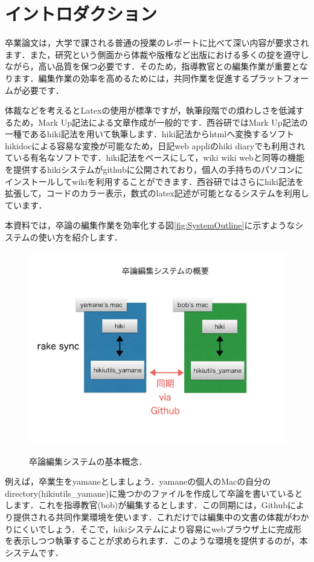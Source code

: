 
\section{イントロダクション}
卒業論文は，大学で課される普通の授業のレポートに比べて深い内容が要求されます．また，研究という側面から体裁や版権など出版における多くの掟を遵守しながら，高い品質を保つ必要です．そのため，指導教官との編集作業が重要となります．編集作業の効率を高めるためには，共同作業を促進するプラットフォームが必要です．

体裁などを考えるとLatexの使用が標準ですが，執筆段階での煩わしさを低減するため，Mark Up記法による文章作成が一般的です\cite{DocGuide}．西谷研ではMark Up記法の一種であるhiki記法を用いて執筆します．hiki記法からhtmlへ変換するソフトhikidocによる容易な変換が可能なため，日記web appliのhiki diaryでも利用されている有名なソフトです．hiki記法をベースにして，wiki wiki webと同等の機能を提供するhikiシステムがgithubに公開されており，個人の手持ちのパソコンにインストールしてwikiを利用することができます．西谷研ではさらにhiki記法を拡張して，コードのカラー表示，数式のlatex記述が可能となるシステムを利用しています．

本資料では，卒論の編集作業を効率化する図\ref{fig:SystemOutline}に示すようなシステムの使い方を紹介します．

\begin{figure}[htbp]\begin{center}
\includegraphics[width=12cm,bb= 0 0 737 553]{../figs/./hikiutils_bob.002.jpeg}
\caption{卒論編集システムの基本概念．}
\label{fig:SystemOutline}
\label{default}\end{center}\end{figure}
例えば，卒業生をyamaneとしましょう．yamaneの個人のMacの自分のdirectory(hikiutils\_yamane)に幾つかのファイルを作成して卒論を書いているとします．これを指導教官(bob)が編集するとします．この同期には，Githubにより提供される共同作業環境を使います．これだけでは編集中の文書の体裁がわかりにくいでしょう．そこで，hikiシステムにより容易にwebブラウザ上に完成形を表示しつつ執筆することが求められます．このような環境を提供するのが，本システムです．

